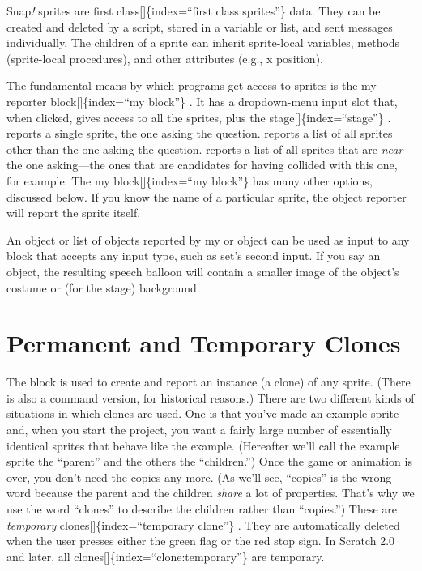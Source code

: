 \documentclass[
  letterpaper,
]{book}
\begin{document}
Snap\emph{!} sprites are ﬁrst class{[}{]}\{index=``ﬁrst class
sprites''\} data. They can be created and deleted by a script, stored in
a variable or list, and sent messages individually. The children of a
sprite can inherit sprite-local variables, methods (sprite-local
procedures), and other attributes (e.g., x position).

The fundamental means by which programs get access to sprites is the my
reporter block{[}{]}\{index=``my block''\} . It has a dropdown-menu
input slot that, when clicked, gives access to all the sprites, plus the
stage{[}{]}\{index=``stage''\} . reports a single sprite, the one asking
the question. reports a list of all sprites other than the one asking
the question. reports a list of all sprites that are \emph{near} the one
asking---the ones that are candidates for having collided with this one,
for example. The my block{[}{]}\{index=``my block''\} has many other
options, discussed below. If you know the name of a particular sprite,
the object reporter will report the sprite itself.

An object or list of objects reported by my or object can be used as
input to any block that accepts any input type, such as set's second
input. If you say an object, the resulting speech balloon will contain a
smaller image of the object's costume or (for the stage) background.

\section{Permanent and Temporary
Clones}\label{permanent-and-temporary-clones}

The block is used to create and report an instance (a clone) of any
sprite. (There is also a command version, for historical reasons.) There
are two different kinds of situations in which clones are used. One is
that you've made an example sprite and, when you start the project, you
want a fairly large number of essentially identical sprites that behave
like the example. (Hereafter we'll call the example sprite the
``parent'' and the others the ``children.'') Once the game or animation
is over, you don't need the copies any more. (As we'll see, ``copies''
is the wrong word because the parent and the children \emph{share} a lot
of properties. That's why we use the word ``clones'' to describe the
children rather than ``copies.'') These are \emph{temporary}
clones{[}{]}\{index=``temporary clone''\} . They are automatically
deleted when the user presses either the green flag or the red stop
sign. In Scratch 2.0 and later, all
clones{[}{]}\{index=``clone:temporary''\} are temporary.
\end{document}
